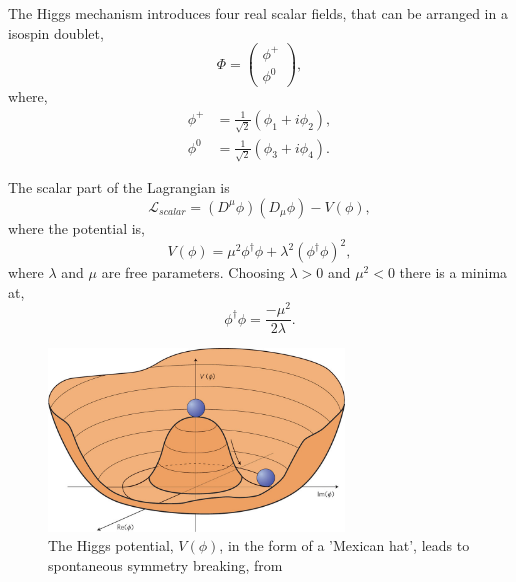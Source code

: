 The Higgs mechanism introduces four real scalar fields, that can be arranged in a
isospin doublet,
\begin{equation}
\Phi = \left( \begin{matrix} \phi^{+} \\ \phi^{0} \end{matrix} \right),
\end{equation}
where,
\begin{align*}
\phi^{+} &=\frac{1}{\sqrt{2}} (\phi_{1} + i \phi_{2}),\\
\phi^{0} &=\frac{1}{\sqrt{2}} (\phi_{3} + i \phi_{4}).
\end{align*}

The scalar part of the Lagrangian is
\begin{equation}
\mathcal{L}_{scalar} = 
\left(D^{\mu}\phi\right) \left(D_{\mu}\phi\right) - V(\phi),
\end{equation}
where the potential is,
\begin{equation}
V(\phi) = 
\mu^{2}\phi^{\dagger}\phi + 
\lambda^{2} \left( \phi^{\dagger} \phi \right)^{2},
\end{equation}
where $\lambda$ and $\mu$ are free parameters. Choosing  $\lambda>0$ and
$\mu^{2}<0$ there is a minima at,
\begin{equation}
\phi^{\dagger} \phi = \frac{- \mu^{2}}{2 \lambda}.
\end{equation}

\begin{figure}[htbp]
  \centering
  \includegraphics[width=0.7\textwidth]{nphys1874-f1.jpg}
  \caption{ The Higgs potential, $V(\phi)$, in the form of a 'Mexican hat',
leads to spontaneous symmetry breaking, from \cite{}}
  \label{fig:higgspot}
\end{figure}

